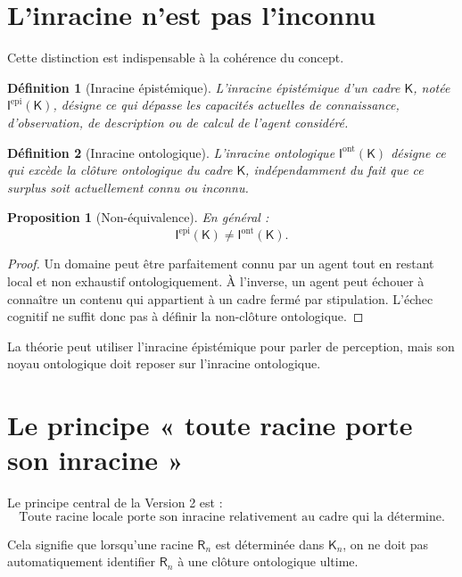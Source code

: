 \documentclass[11pt,a4paper]{article}
\newtheorem{definition}{Définition}[section]
\newtheorem{proposition}{Proposition}[section]
\newcommand{\Rac}{\mathsf{R}}
\newcommand{\Inrac}{\mathsf{I}}
\newcommand{\Cadre}{\mathsf{K}}
\begin{document}
\section{L'inracine n'est pas l'inconnu}

Cette distinction est indispensable à la cohérence du concept.

\begin{definition}[Inracine épistémique]
L'inracine épistémique d'un cadre \(\Cadre\), notée \(\Inrac^{\mathrm{epi}}(\Cadre)\),
désigne ce qui dépasse les capacités actuelles de connaissance,
d'observation, de description ou de calcul de l'agent considéré.
\end{definition}

\begin{definition}[Inracine ontologique]
L'inracine ontologique \(\Inrac^{\mathrm{ont}}(\Cadre)\) désigne ce qui excède
la clôture ontologique du cadre \(\Cadre\), indépendamment du fait que ce
surplus soit actuellement connu ou inconnu.
\end{definition}

\begin{proposition}[Non-équivalence]
En général :
\[
\boxed{
\Inrac^{\mathrm{epi}}(\Cadre)\neq
\Inrac^{\mathrm{ont}}(\Cadre).
}
\]
\end{proposition}

\begin{proof}
Un domaine peut être parfaitement connu par un agent tout en restant local et
non exhaustif ontologiquement. À l'inverse, un agent peut échouer à connaître
un contenu qui appartient à un cadre fermé par stipulation. L'échec cognitif
ne suffit donc pas à définir la non-clôture ontologique.
\end{proof}

La théorie peut utiliser l'inracine épistémique pour parler de perception,
mais son noyau ontologique doit reposer sur l'inracine ontologique.

\section{Le principe « toute racine porte son inracine »}

Le principe central de la Version 2 est :
\[
\boxed{
\text{Toute racine locale porte son inracine relativement au cadre qui la détermine.}
}
\]

Cela signifie que lorsqu'une racine \(\Rac_n\) est déterminée dans \(\Cadre_n\),
on ne doit pas automatiquement identifier \(\Rac_n\) à une clôture ontologique
ultime.
\end{document}
